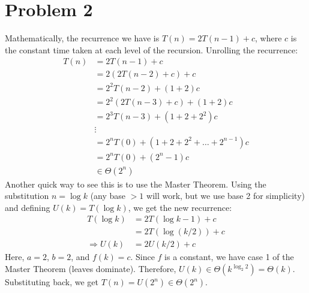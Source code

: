 \documentclass{article}
\begin{document}
\section{Problem 2}
  Mathematically, the recurrence we have is $T(n) = 2T(n - 1) + c$, where $c$ is the constant time taken at each level of the recursion.
  Unrolling the recurrence:
  \begin{align*}
    T(n) &= 2T(n - 1) + c \\
    &= 2(2T(n - 2) + c) + c \\
    &= 2^2 T(n - 2) + (1 + 2)c \\
    &= 2^2 (2T(n - 3) + c) + (1 + 2)c \\
    &= 2^3 T(n - 3) + (1 + 2 + 2^2)c \\
    &\vdots \\
    &= 2^n T(0) + (1 + 2 + 2^2 + \ldots + 2^{n - 1})c \\
    &= 2^n T(0) + (2^n - 1)c \\
    &\in \Theta(2^n)
  \end{align*}
  Another quick way to see this is to use the Master Theorem.
  Using the substitution $n = \log k$ (any base $> 1$ will work, but we use base 2 for simplicity) and defining $U(k) = T(\log k)$, we get the new recurrence:
  \begin{align*}
    T(\log k) &= 2T(\log k - 1) + c \\
    &= 2T(\log (k / 2)) + c \\
    \Rightarrow U(k) &= 2U(k / 2) + c
  \end{align*}
  Here, $a = 2$, $b = 2$, and $f(k) = c$.
  Since $f$ is a constant, we have case 1 of the Master Theorem (leaves dominate).
  Therefore, $U(k) \in \Theta(k^{\log_2 2}) = \Theta(k)$.
  Substituting back, we get $T(n) = U(2^n) \in \Theta(2^n)$.
\end{document}
